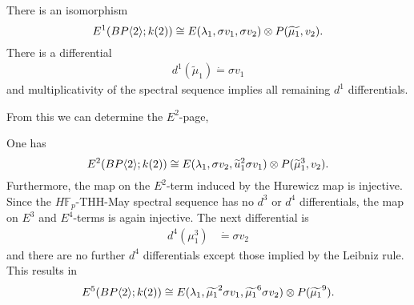 \begin{comment}
\begin{prop}
	The class
	\[
	\varepsilon_1:= \otau_1+\widetilde{\tau_1}-\xi_1\widetilde{\tau_0}
	\]
	is a comodule primitive. Furthermore, $d^1\varepsilon_1 = v_1$.
\end{prop}
\begin{proof}
	We need to recall formulas in the Steenrod algebra relating $\xi_i$ and $\tau_i$ to their conjugates. Namely, we have the relations
	\begin{align*}
		\sum_{i+j=n}\xi_j^{p^i}\overline{\xi_i}=0 & & \tau_n+\sum_{i+j=n}\xi_j^{p^i}\otau_n =0
	\end{align*}
	In particular, letting $n$ be 1 or 0, we find 
	\begin{align*}
		\zeta_1 &= -\xi_1 & \otau_0&=-\tau_0  &\tau_1+\xi_1\otau_0+\otau_1 &= 0
	\end{align*}
	These relations will show that $\epsilon_1$ is a comodule primitive. Indeed, we obtain
	\begin{align*}
		\alpha(\varepsilon_1) &= \otau_1\otimes 1 + \otau_0\otimes \zeta_1+1\otimes \otau_1+\tau_1\otimes 1+\xi_1\otimes\widetilde{\tau_0}+1\otimes \widetilde{\tau_1} - (\tau_0\otimes 1+1\otimes \widetilde{\tau_0})(\xi_1\otimes 1+1\otimes \xi_1)
	\end{align*}
	Observe that $\otau_0\otimes \zeta_1 = \tau_0\otimes \xi_1$. After expanding the last term and cancelling, we obtain
	\[
	\alpha(\varepsilon_1) = (\otau_1+\tau_1)\otimes -\tau_0\xi_1\otimes 1+1\otimes \epsilon_1.
	\]
	From the above relations, we get
	\[
	\otau_1+\tau_1 = \xi_1\tau_0,
	\]
	which shows that $\alpha(\varepsilon_1) = \varepsilon_1$.
\end{proof}
\end{comment}
\begin{cor}
	There is an isomorphism
	\[
	E^1(BP\langle 2 \rangle;k(2))\cong E(\lambda_1, \sigma v_1, \sigma v_2)\otimes P(\widetilde{\mu_1},v_2).
	\]
	There is a differential
	\begin{align*}
		d^1(\widetilde{\mu}_1)\dot{=}\sigma v_1
	\end{align*}
	and multiplicativity of the spectral sequence implies all remaining $d^1$ differentials.
\end{cor}

From this we can determine the $E^2$-page,

\begin{cor}
	One has 
	\[
	E^2(BP\langle 2 \rangle;k(2))\cong E(\lambda_1, \sigma v_2, \widetilde{u}_1^2\sigma v_1)\otimes P(\widetilde{\mu}_1^3, v_2).
	\]
	Furthermore, the map on the $E^2$-term induced by the Hurewicz map is injective. Since the $H\mathbb{F}_p$-THH-May spectral sequence has no $d^3$ or $d^4$ differentials, the map on $E^3$ and $E^4$-terms is again injective. The next differential is
	\begin{align*}
		d^4(\mu_1^3) &\dot{=} \sigma v_2
	\end{align*}
	and there are no further $d^4$ differentials except those implied by the Leibniz rule. 
	This results in 
	\[
	E^5(BP\langle 2 \rangle;k(2))\cong E(\lambda_1, \widetilde{\mu_1}^2\sigma v_1, \widetilde{\mu_1}^6\sigma v_2)\otimes P(\widetilde{\mu_1}^9).
	\]
\end{cor}

